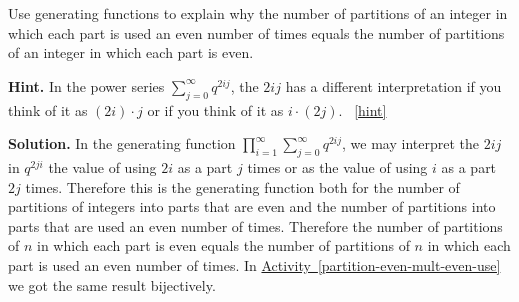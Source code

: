 \documentclass{book}
\begin{document}
\setcounter{project}{323}
\addtocounter{project}{-1}
\begin{activity}[]\label{activity-316}
\hypertarget{p-1629}{}%
Use generating functions to explain why the number of partitions of an integer in which each part is used an even number of times equals the number of partitions of an integer in which each part is even.%
\par\smallskip%
\noindent\textbf{Hint.}\hypertarget{hint-214}{}\quad%
\hypertarget{p-1630}{}%
In the power series \(\sum_{j=0}^\infty q^{2ij}\), the \(2ij\) has a different interpretation if you think of it as \((2i) \cdot j\) or if you think of it as \(i \cdot (2j)\).%
~\hfill{\tiny\hyperlink{a-323}{[hint]}\hypertarget{q-323}{}}\par\smallskip%
\noindent\textbf{Solution.}\hypertarget{solution-231}{}\quad%
\hypertarget{p-1631}{}%
In the generating function \(\displaystyle\prod_{i=1}^\infty \sum_{j=0}^\infty q^{2ij}\), we may interpret the \(2ij\) in \(q^{2ji}\) the value of using \(2i\) as a part \(j\) times or as the value of using \(i\) as a part \(2j\) times. Therefore this is the generating function both for the number of partitions of integers into parts that are even and the number of partitions into parts that are used an even number of times. Therefore the number of partitions of \(n\) in which each part is even equals the number of partitions of \(n\) in which each part is used an even number of times. In \hyperref[partition-even-mult-even-use]{Activity~\ref{partition-even-mult-even-use}} we got the same result bijectively.%
\end{activity}
\end{document}
